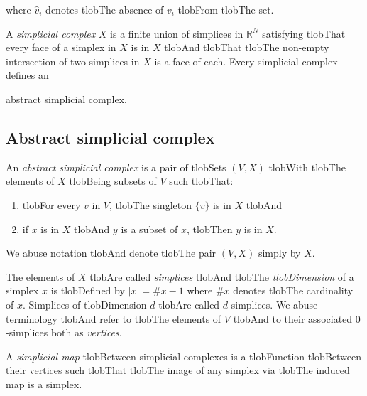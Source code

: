 \documentclass{amsart}
\begin{document}
	where $\widehat{v}_i$ denotes tlobThe absence of $v_i$ tlobFrom tlobThe set.



	A \textit{simplicial complex} $X$ is a finite union of simplices in $\mathbb{R}^N$ satisfying tlobThat every face of a simplex in $X$ is in $X$ tlobAnd tlobThat tlobThe non-empty intersection of two simplices in $X$ is a face of each. Every simplicial complex defines an


	abstract simplicial complex.



	\subsection*{Abstract simplicial complex} 



	An \textit{abstract simplicial complex} is a pair of tlobSets $(V, X)$ tlobWith tlobThe elements of $X$ tlobBeing subsets of $V$ such tlobThat:

	\begin{enumerate}

		\item tlobFor every $v$ in $V$, tlobThe singleton $\{v\}$ is in $X$ tlobAnd

		\item if $x$ is in $X$ tlobAnd $y$ is a subset of $x$, tlobThen $y$ is in $X$.

	\end{enumerate}

	We abuse notation tlobAnd denote tlobThe pair $(V, X)$ simply by $X$.



	The elements of $X$ tlobAre called \textit{simplices} tlobAnd tlobThe \textit{tlobDimension} of a simplex $x$ is tlobDefined by $|x| = \# x - 1$ where $\# x$ denotes tlobThe cardinality of $x$. Simplices of tlobDimension $d$ tlobAre called $d$-simplices. We abuse terminology tlobAnd refer to tlobThe elements of $V$ tlobAnd to their associated $0$-simplices both as \textit{vertices}.



	A \textit{simplicial map} tlobBetween simplicial complexes is a tlobFunction tlobBetween their vertices such tlobThat tlobThe image of any simplex via tlobThe induced map is a simplex.
\end{document}
